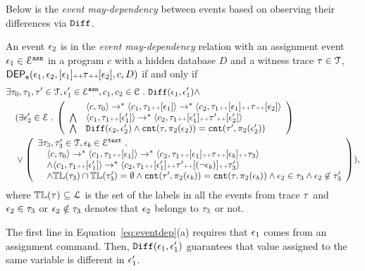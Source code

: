 {Below is the \emph{event may-dependency} between events based on observing their differences via $\mathtt{Diff}$.}
\begin{defn}
\label{def:event_dep}
An event $\mathtt{\epsilon}_2$ is in the \emph{event may-dependency} relation with an assignment event $\mathtt{\epsilon}_1 \in \mathcal{E}^{\mathtt{{asn}}}$ in a program ${c}$  with a hidden database $D$ and a witness trace $\mathtt{\tau} \in \mathcal{T}$,
$\mathsf{DEP_{\mathtt{e}}}(\mathtt{\epsilon}_1, \mathtt{\epsilon}_2, [\mathtt{\epsilon}_1 ] {\scriptscriptstyle ++} \mathtt{\tau} {\scriptscriptstyle ++} [\mathtt{\epsilon}_2], c, D)$ if and only if
\begin{subequations}
\begin{align}
&  
\exists \trace_0, \trace_1, \trace' \in \mathcal{T},\event_1' \in \eventset^{\asn}, {c}_1, {c}_2  \in \cdom  \st \diff(\event_1, \event_1') \land \\
& 
\quad (\exists  \event_2' \in \eventset \st 
\left(
\begin{array}{ll}   
  & \config{{c}, \trace_0} \rightarrow^{*} 
  \config{{c}_1, \trace_1 \tracecat [\event_1]}  \rightarrow^{*} 
  \config{{c}_2,  \trace_1 \tracecat [\event_1] \tracecat \trace \tracecat [\event_2] } 
   \\ 
   \bigwedge &
   \config{{c}_1, \trace_1 \tracecat [\event_1']}  \rightarrow^{*}
    \config{{c}_2,  \trace_1 \tracecat[ \event_1'] \tracecat \trace' \tracecat [\event_2'] } 
  \\
  \bigwedge & 
  \diff(\event_2,\event_2' ) \land 
  \vcounter(\trace, \pi_2(\event_2))
  = 
  \vcounter(\trace', \pi_2(\event_2'))\\
  \end{array}
  \right)\\ 
  & 
  \quad
  \lor 
  \left(
  \begin{array}{l} 
  \exists \trace_3, \trace_3'  \in \mathcal{T}, \event_b \in \eventset^{\test} \st 
  \\
   \quad \config{{c}, \trace_0} \rightarrow^{*} \config{{c}_1, \trace_1 \tracecat [\event_1]}  \rightarrow^{*}
   \config{c_2,  \trace_1 \tracecat [\event_1] \tracecat
   \trace \tracecat [\event_b] \tracecat  \trace_3} 
\\ \quad \land
\config{{c}_1, \trace_1 \tracecat [\event_1']}  \rightarrow^{*} 
\config{c_2,  \trace_1 \tracecat [\event_1'] \tracecat \trace' \tracecat [(\neg \event_b)] \tracecat \trace_3'} 
\\
\quad \land \tlabel({\trace_3}) \cap \tlabel({\trace_3'})
= \emptyset
\land \vcounter(\trace', \pi_2(\event_b)) = \vcounter(\trace, \pi_2(\event_b)) 
    \land \event_2 \in \trace_3
    \land \event_2 \not\in \trace_3'
  \end{array}
  \right)
  ),
\end{align}
\label{eq:eventdep}
\end{subequations}
where $\mathbb{TL}(\mathtt{\tau}) \subseteq \mathcal{L}$ is the set of the labels in all the events from trace $\mathtt{\tau}$ and $\mathtt{\epsilon}_2 \in \mathtt{\tau}_3$ or $\mathtt{\epsilon}_2 \notin \mathtt{\tau}_3$ denotes that $\mathtt{\epsilon}_2$ belongs to $\mathtt{\tau}_3$ or not.
\end{defn}
The first line in Equation~\ref{eq:eventdep}(a) requires that $\mathtt{\epsilon}_1$ comes from an assignment command.
Then, $\mathtt{Diff}(\mathtt{\epsilon}_1, \mathtt{\epsilon}_1')$ guarantees that value assigned to the same variable is different in $\mathtt{\epsilon}_1'$.


